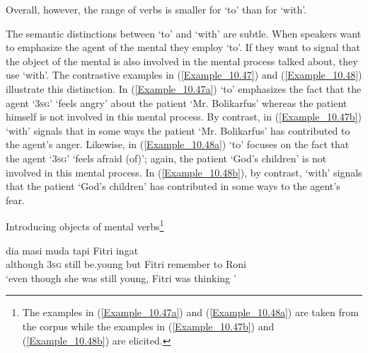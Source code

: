  Overall, however, the range of verbs is smaller for  ‘to’ than for   ‘with’.



The semantic distinctions between  ‘to’ and  ‘with’ are subtle. When speakers want to emphasize the agent of the mental  they employ  ‘to’. If they want to signal that the object of the mental  is also involved in the mental process talked about, they use   ‘with’. The contrastive examples in (\ref{Example_10.47}) and (\ref{Example_10.48}) illustrate this distinction. In (\ref{Example_10.47a})  ‘to’ emphasizes the fact that the agent  ‘3\textsc{sg}’  ‘feels angry’ about the patient  ‘Mr. Bolikarfus’ whereas the patient himself is not involved in this mental process. By contrast, in (\ref{Example_10.47b})  ‘with’ signals that in some ways the patient  ‘Mr. Bolikarfus’ has contributed to the agent’s anger. Likewise, in (\ref{Example_10.48a})  ‘to’ focuses on the fact that the agent  ‘3\textsc{sg}’  ‘feels afraid (of)’; again, the patient  ‘God’s children’ is not involved in this mental process. In (\ref{Example_10.48b}), by contrast,  ‘with’ signals that the patient  ‘God’s children’ has contributed in some ways to the agent’s fear.

\newpage

\begin{styleExampleTitle}
Introducing objects of mental verbs\footnote{The examples in (\ref{Example_10.47a}) and (\ref{Example_10.48a}) are taken from the corpus while the examples in (\ref{Example_10.47b}) and (\ref{Example_10.48b}) are elicited.}
\end{styleExampleTitle}

\ea
\label{Example_10.46}
 {dia} {masi} {muda} {tapi} {Fitri} {ingat} {} {}\\ %
 although  \textsc{3sg}  still  be.young  but  Fitri  remember  to  Roni\\
\glt 
‘even though she was still young, Fitri was thinking ’ \textstyleExampleSource{[081006-024-CvEx.0067]}
\z

